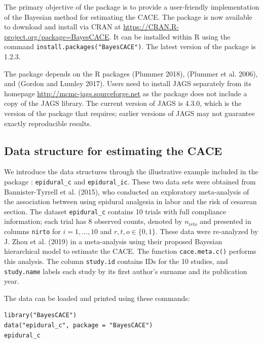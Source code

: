 The primary objective of the  package is to provide a user-friendly implementation of the Bayesian method for estimating the CACE. The package is now available to download and install via CRAN at \url{https://CRAN.R-project.org/package=BayesCACE}. It can be installed within R using the command \texttt{install.packages("BayesCACE")}. The latest version of the package is 1.2.3.

The  package depends on the R packages  (Plummer 2018),  (Plummer et al. 2006), and  (Gordon and Lumley 2017). Users need to install \textsf{JAGS} separately from its homepage \url{http://mcmc-jags.sourceforge.net} as the  package does not include a copy of the \textsf{JAGS} library. The current version of \textsf{JAGS} is 4.3.0, which is the version of the package that  requires; earlier versions of \textsf{JAGS} may not guarantee exactly reproducible results.

\hypertarget{data-structure-for-estimating-the-cace}{%
\subsection{Data structure for estimating the CACE}\label{data-structure-for-estimating-the-cace}}

We introduce the data structures through the illustrative example included in the package : \texttt{epidural\_c} and \texttt{epidural\_ic}. These two data sets were obtained from Bannister-Tyrrell et al. (2015), who conducted an exploratory meta-analysis of the association between using epidural analgesia in labor and the risk of cesarean section. The dataset \texttt{epidural\_c} contains 10 trials with full compliance information; each trial has 8 observed counts, denoted by \(n_{irto}\) and presented in columns \texttt{nirto} for \(i=1, \dots, 10\) and \(r, t, o \in \{0, 1\}\). These data were re-analyzed by J. Zhou et al. (2019) in a meta-analysis using their proposed Bayesian hierarchical model to estimate the CACE. The function \texttt{cace.meta.c()} performs this analysis. The column \texttt{study.id} contains IDs for the 10 studies, and \texttt{study.name} labels each study by its first author's surname and its publication year.

The data can be loaded and printed using these commands:

\begin{verbatim}
library("BayesCACE")
data("epidural_c", package = "BayesCACE")
epidural_c
\end{verbatim}

